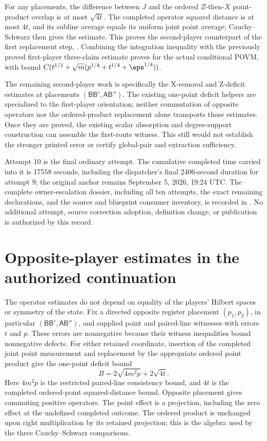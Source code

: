 \documentclass[11pt]{article}
\begin{document}
For any placements, the difference between $J$ and the ordered
$Z$-then-$X$ point-product overlap is at most $\sqrt{4t}$. The completed
operator squared distance is at most $4t$, and its subline average equals
its uniform joint point average; Cauchy--Schwarz then gives the estimate.
This proves the second-player counterpart of the first replacement step,
.
Combining the integration inequality with the previously proved first-player
three-claim estimate proves
 for the actual
conditional POVM, with bound
$C(t^{1/2}+\sqrt m(p^{1/4}+t^{1/4}+\eps^{1/4}))$.

The remaining second-player work is specifically the X-removal and
Z-deficit estimates at placements $(\mathsf{BB}',\mathsf{AB}'')$.
The existing one-point deficit helpers are specialized to the first-player
orientation; neither commutation of opposite operators nor the ordered-product
replacement alone transports those estimates. Once they are proved, the
existing scalar absorption and degree-support construction can assemble the
first-route witness. This still would not establish the stronger printed
error or certify global-pair and extraction sufficiency.

Attempt 10 is the final ordinary attempt. The cumulative completed time
carried into it is 17558 seconds, including the dispatcher's final
2406-second duration for attempt 9; the original anchor remains
September 5, 2026, 19:24 UTC. The complete owner-escalation dossier, including
all ten attempts, the exact remaining declarations, and the source and
blueprint consumer inventory, is recorded in
.
No additional attempt, source correction adoption, definition change, or
publication is authorized by this record.

\section{Opposite-player estimates in the authorized continuation}

The operator estimates do not depend on equality of the players' Hilbert
spaces or symmetry of the state. Fix a directed opposite register placement
$(p_1,p_2)$, in particular $(\mathsf{BB}',\mathsf{AB}'')$, and supplied
point and paired-line witnesses with errors $t$ and $p$. These errors are
nonnegative because their witness inequalities bound nonnegative defects.
For either retained coordinate, insertion of the completed joint point
measurement and replacement by the appropriate ordered point product give
the one-point deficit bound
\[
 B=2\sqrt{4m^2p}+2\sqrt{4t}.
\]
Here $4m^2p$ is the restricted paired-line consistency bound, and $4t$ is
the completed ordered-point squared-distance bound. Opposite placement gives
commuting positive operators. The point effect is a projection, including
the zero effect at the undefined completed outcome. The ordered product
is unchanged upon right multiplication by its retained projection; this
is the algebra used by the three Cauchy--Schwarz comparisons.
\end{document}
